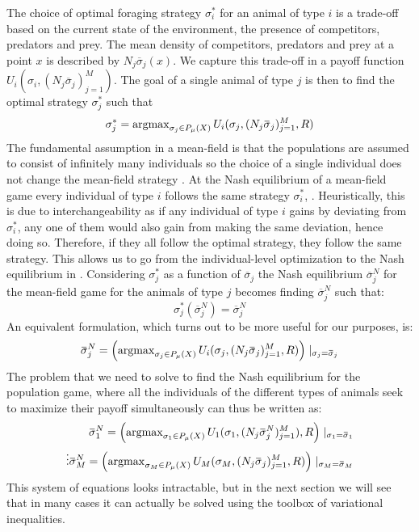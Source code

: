 The choice of optimal foraging strategy $\sigma_i^*$ for an animal of type $i$ is a trade-off based on the current state of the environment, the presence of competitors, predators and prey. The mean density of competitors, predators and prey at a point $x$ is described by $N_j \overbar{\sigma}_j(x)$. We capture this trade-off in a payoff function $U_i(\sigma_i, (N_j \overbar{\sigma}_j)_{j=1}^M)$. The goal of a single animal of type $j$ is then to find the optimal strategy $\sigma_j^*$ such that
\begin{equation}
  \label{eq:ind_opt}
  \sigma^*_j = \argmax_{\sigma_j \in P_{\mu}(X)} U_i(\sigma_j, (N_j \overbar{\sigma}_j)_{j=1}^M, R)
\end{equation}
The fundamental assumption in a mean-field is that the populations are assumed to consist of infinitely many individuals so the choice of a single individual does not change the mean-field strategy \citep{aumann1964markets}. At the Nash equilibrium of a mean-field game every individual of type $i$ follows the same strategy $\sigma_i^*$, \citep{lasry2007mean}. Heuristically, this is due to interchangeability as if any individual of type $i$ gains by deviating from $\sigma_i^*$, any one of them would also gain from making the same deviation, hence doing so. Therefore, if they all follow the optimal strategy, they follow the same strategy. This allows us to go from the individual-level optimization to the Nash equilibrium in . Considering $\sigma^*_{j}$ as a function of $\overbar{\sigma}_j$ the Nash equilibrium $\overbar{\sigma}_j^N$ for the mean-field game for the animals of type $j$ becomes finding $\overbar{\sigma}_j^N$ such that:
\begin{equation}
  \sigma^*_{j}(\overbar{\sigma}^N_j) = \overbar{\sigma}^N_j
\end{equation}
An equivalent formulation, which turns out to be more useful for our purposes, is:
\begin{equation}
  \label{eq:mfg_ne}
  \overbar{\sigma}_j^N = \pa{\argmax_{\sigma_j \in P_{\mu}(X)} U_i(\sigma_j, (N_j \overbar{\sigma}_j)_{j=1}^M, R) } \mid_{\sigma_j = \overbar{\sigma}_j}
\end{equation}
The problem that we need to solve to find the Nash equilibrium for the population game, where all the individuals of the different types of animals seek to maximize their payoff simultaneously can thus be written as:
\begin{equation}
  \label{eq:tot_nash_eq}
  \begin{split}
    \overbar{\sigma}_1^N = \pa{\argmax_{\sigma_1 \in P_{\mu}(X)} U_1(\sigma_1, (N_j \overbar{\sigma}^N_j)_{j=1}^M), R } \mid_{\sigma_1 = \overbar{\sigma}_1} \\
    \vdots
    \overbar{\sigma}_M^N = \pa{\argmax_{\sigma_M \in P_{\mu}(X)} U_M(\sigma_M, (N_j \overbar{\sigma}_j)_{j=1}^M, R) } \mid_{\sigma_M = \overbar{\sigma}_M}
    \end{split}
\end{equation}
This system of equations looks intractable, but in the next section we will see that in many cases it can actually be solved using the toolbox of variational inequalities.

